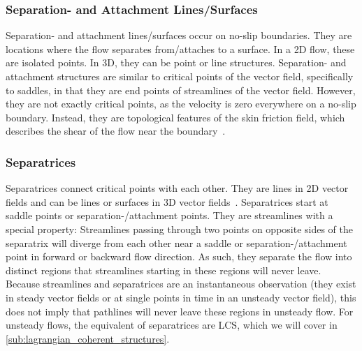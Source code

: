 \subsubsection{Separation- and Attachment Lines/Surfaces} %
\label{ssub:separation_attachment_lines}
%
Separation- and attachment lines/surfaces occur on no-slip boundaries.
%
They are locations where the flow separates from/attaches to a surface.
%
In a \ac{2D} flow, these are isolated points.
%
In \ac{3D}, they can be point or line structures.
%
Separation- and attachment structures are similar to critical points of the
vector field, specifically to saddles, in that they are end points of
streamlines of the vector field.
%
However, they are not exactly critical points, as the velocity is zero
everywhere on a no-slip boundary.
%
Instead, they are topological features of the skin friction field, which
describes the shear of the flow near the boundary~\cite{Surana2006}.
%

\subsubsection{Separatrices} %
\label{ssub:separatrices}
%
Separatrices connect critical points with each other.
%
They are lines in \ac{2D} vector fields and can be lines or surfaces in \ac{3D}
vector fields~\cite{Helman1989,Helman1991}.
%
Separatrices start at saddle points or separation-/attachment points.
%
They are streamlines with a special property: Streamlines passing through two
points on opposite sides of the separatrix will diverge from each other near a
saddle or separation-/attachment point in forward or backward flow direction.
%
As such, they separate the flow into distinct regions that streamlines starting
in these regions will never leave.
%
Because streamlines and separatrices are an instantaneous observation (they
exist in steady vector fields or at single points in time in an unsteady vector
field), this does not imply that pathlines will never leave these regions in
unsteady flow.
%
For unsteady flows, the equivalent of separatrices are \acl{LCS}, which we will
cover in \cref{sub:lagrangian_coherent_structures}.
%
%
%
